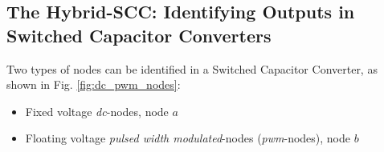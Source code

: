 \subsection[Introducing H-SCC]{The Hybrid-SCC: Identifying Outputs in Switched Capacitor Converters}

Two types of nodes can be identified in a Switched Capacitor Converter, as shown in Fig. \ref{fig:dc_pwm_nodes}:
\begin{itemize}
  \item Fixed voltage \emph{dc}-nodes, node $a$ %
  \item Floating voltage \emph{pulsed width modulated}-nodes (\emph{pwm}-nodes),  node $b$ %
\end{itemize}



